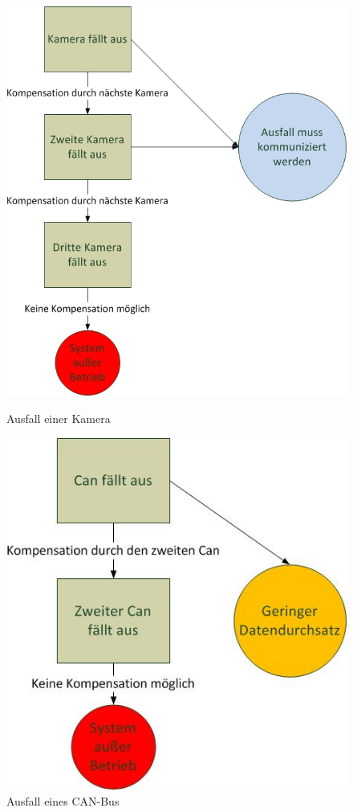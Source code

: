 \begin{figure}[H]
\centering
  \begin{minipage}[b]{0.49\linewidth}
    \includegraphics[width=\linewidth]{Bilder/FaTNet_kameraredundanz} 
    \caption{Ausfall einer Kamera}
    \label{fig:kameraredundanz}
  \end{minipage}
  \begin{minipage}[b]{0.49\linewidth}
    \includegraphics[width=\linewidth]{Bilder/FaTNet_canredundanz}  
    \caption{Ausfall eines CAN-Bus}
    \label{fig:canredundanz}
  \end{minipage}
\end{figure}

